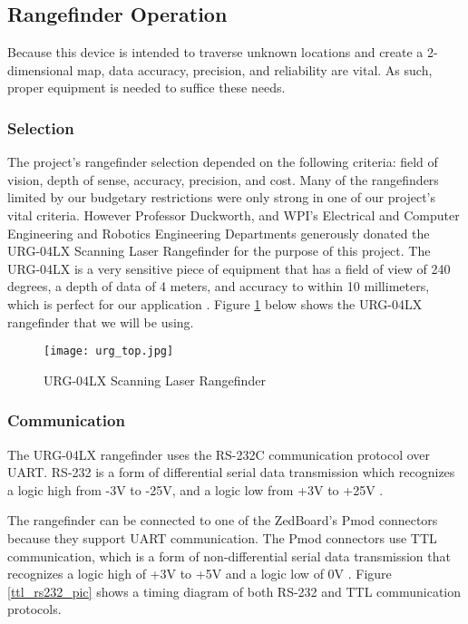 \subsection{Rangefinder Operation}
Because this device is intended to traverse unknown locations and create a 2-dimensional map, data accuracy, precision, and reliability are vital. As such, proper equipment is needed to suffice these needs. 

\subsubsection{Selection}
The project's rangefinder selection depended on the following criteria: field of vision, depth of sense, accuracy, precision, and cost. Many of the rangefinders limited by our budgetary restrictions were only strong in one of our project's vital criteria. However Professor Duckworth, and WPI's Electrical and Computer Engineering and Robotics Engineering Departments generously donated the URG-04LX Scanning Laser Rangefinder for the purpose of this project. The URG-04LX is a very sensitive piece of equipment that has a field of view of 240 degrees, a depth of data of 4 meters, and accuracy to within 10 millimeters, which is perfect for our application \cite{urg04lx_specifications}. Figure \ref{rangefinder_pic} below shows the URG-04LX rangefinder that we will be using.

\begin{figure}[H]
	\centerline{\texttt{[image: urg\_top.jpg]}}
	\caption{URG-04LX Scanning Laser Rangefinder}
	\label{rangefinder_pic}
\end{figure}

\subsubsection{Communication}
The URG-04LX rangefinder uses the RS-232C communication protocol over UART. RS-232 is a form of differential serial data transmission which recognizes a logic high from -3V to -25V, and a logic low from +3V to +25V \cite{rs232}.
\par
The rangefinder can be connected to one of the ZedBoard's Pmod connectors because they support UART communication. The Pmod connectors use TTL communication, which is a form of non-differential serial data transmission that recognizes a logic high of +3V to +5V and a logic low of 0V \cite{ttl}. Figure \ref{ttl_rs232_pic} shows a timing diagram of both RS-232 and TTL communication protocols.


